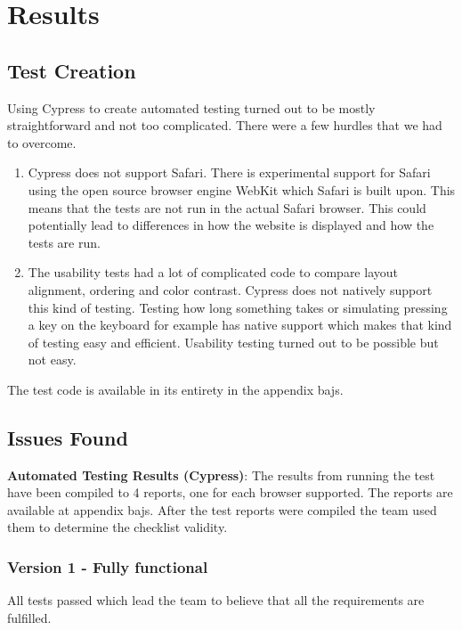\documentclass[journal,twocolumn]{IEEEtran}
\begin{document}
\section{Results}
\subsection{Test Creation}
Using Cypress to create automated testing turned out to be mostly straightforward and not too complicated. There were a few hurdles that we had to overcome.

\begin{enumerate}
    \item Cypress does not support Safari. There is experimental support for Safari using the open source browser engine WebKit which Safari is built upon. This means that the tests are not run in the actual Safari browser. This could potentially lead to differences in how the website is displayed and how the tests are run.
    \item The usability tests had a lot of complicated code to compare layout alignment, ordering and color contrast. Cypress does not natively support this kind of testing. Testing how long something takes or simulating pressing a key on the keyboard for example has native support which makes that kind of testing easy and efficient. Usability testing turned out to be possible but not easy.
\end{enumerate}

The test code is available in its entirety in the appendix bajs. %

\subsection{Issues Found}
\textbf{Automated Testing Results (Cypress)}:
The results from running the test have been compiled to 4 reports, one for each browser supported. The reports are available at appendix bajs. %
After the test reports were compiled the team used them to determine the checklist validity.
\subsubsection{Version 1 - Fully functional}
All tests passed which lead the team to believe that all the requirements are fulfilled.
\end{document}
